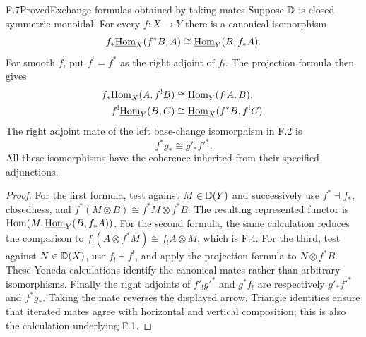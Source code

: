 \begin{claim}{F.7}{Proved}{Exchange formulas obtained by taking mates}
Suppose $\mathbb D$ is closed symmetric monoidal. For every $f:X\to Y$ there is a canonical isomorphism
\[
 f_*\underline{\mathrm{Hom}}_X(f^*B,A)
 \cong\underline{\mathrm{Hom}}_Y(B,f_*A).
\]
For smooth $f$, put $f^!=f^*$ as the right adjoint of $f_!$. The projection formula then gives
\begin{align*}
 f_*\underline{\mathrm{Hom}}_X(A,f^!B)&\cong
 \underline{\mathrm{Hom}}_Y(f_!A,B),\\
 f^!\underline{\mathrm{Hom}}_Y(B,C)&\cong
 \underline{\mathrm{Hom}}_X(f^*B,f^!C).
\end{align*}
The right adjoint mate of the left base-change isomorphism in F.2 is
\[
 f^*g_*\cong g'_*f'^*.
\]
All these isomorphisms have the coherence inherited from their specified adjunctions.
\end{claim}
\begin{proof}
For the first formula, test against $M\in\mathbb D(Y)$ and successively use $f^*\dashv f_*$, closedness, and $f^*(M\otimes B)\cong f^*M\otimes f^*B$. The resulting represented functor is $\mathrm{Hom}(M,\underline{\mathrm{Hom}}_Y(B,f_*A))$. For the second formula, the same calculation reduces the comparison to
$f_!(A\otimes f^*M)\cong f_!A\otimes M$, which is F.4. For the third, test against $N\in\mathbb D(X)$, use $f_!\dashv f^!$, and apply the projection formula to $N\otimes f^*B$. These Yoneda calculations identify the canonical mates rather than arbitrary isomorphisms. Finally the right adjoints of $f'_!g'^*$ and $g^*f_!$ are respectively $g'_*f'^*$ and $f^*g_*$. Taking the mate reverses the displayed arrow. Triangle identities ensure that iterated mates agree with horizontal and vertical composition; this is also the calculation underlying F.1.
\end{proof}

